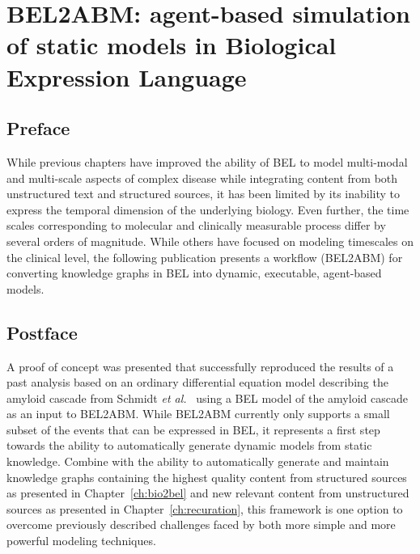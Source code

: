 \chapter{BEL2ABM: agent-based simulation of static models in Biological Expression Language}
\label{ch:bel2abm}

\section*{Preface}

While previous chapters have improved the ability of \ac{BEL} to model multi-modal and multi-scale aspects of complex disease while integrating content from both unstructured text and structured sources, it has been limited by its inability to express the temporal dimension of the underlying biology.
Even further, the time scales corresponding to molecular and clinically measurable process differ by several orders of magnitude.
While others have focused on modeling timescales on the clinical level, the following publication presents a workflow (BEL2ABM) for converting knowledge graphs in \ac{BEL} into dynamic, executable, agent-based models.

\vspace*{\fill}



\section*{Postface}

A proof of concept was presented that successfully reproduced the results of a past analysis based on an ordinary differential equation model describing the amyloid cascade from Schmidt \textit{et al.}~\cite{Schmidt2012} using a \ac{BEL} model of the amyloid cascade as an input to BEL2ABM\@.
While BEL2ABM currently only supports a small subset of the events that can be expressed in \ac{BEL}, it represents a first step towards the ability to automatically generate dynamic models from static knowledge.
Combine with the ability to automatically generate and maintain knowledge graphs containing the highest quality content from structured sources as presented in Chapter~\ref{ch:bio2bel} and new relevant content from unstructured sources as presented in Chapter~\ref{ch:recuration}, this framework is one option to overcome previously described challenges faced by both more simple and more powerful modeling techniques.
